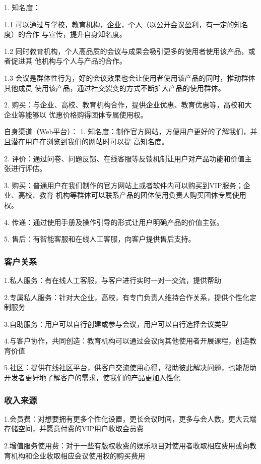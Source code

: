 \documentclass[a4paper,12pt]{article}
\begin{document}
    1. 知名度：

    1.1 可以通过与学校，教育机构，企业，个人（以公开会议盈利，有一定的知名度）的合作
    与宣传，提升自身知名度。

    1.2 同时教育机构，个人高品质的会议与成果会吸引更多的使用者使用该产品，或者促进其
    他机构与个人与产品的合作。

    1.3 会议是群体性行为，好的会议效果也会让使用者使用该产品的同时，推动群体其他成员
    使用该产品，通过社交裂变的方式不断扩大产品的使用群体。


    2. 购买：与企业、高校、教育机构合作，提供企业优惠、教育优惠等，高校和大企业等能够以
    优惠价格购得团体专属使用权。

    \noindent 自身渠道（Web平台）：
    1. 知名度：制作官方网站，方便用户更好的了解我们，并且潜在用户在浏览到我们的网站时可以提
    高知名度。

    2. 评价：通过问卷、问题反馈、在线客服等反馈机制让用户对产品功能和价值主张进行评估。

    3. 购买：普通用户在我们制作的官方网站上或者软件内可以购买到VIP服务；企业、高校、教育
    机构等群体可以联系产品的团体使用负责人购买团体专属使用权。

    4. 传递：通过使用手册及操作引导的形式让用户明确产品的价值主张。

    5. 售后：有智能客服和在线人工客服，向客户提供售后支持。
    \subsubsection{客户关系}
    1.私人服务：有在线人工客服，与客户进行实时一对一交流，提供帮助

    2.专属私人服务：针对大企业，高校，有专门负责人维持合作关系，提供个性化定制服务

    3.自助服务：用户可以自行创建或参与会议，用户可以自行选择会议类型

    4.与客户协作，共同创造：教育机构可以通过会议向其他使用者开展课程，创造教育价值

    5.社区：提供在线社区平台，供客户交流使用心得，帮助彼此解决问题，也能帮助开发者更好地了解客户的需求，使我们的产品更加人性化
    \subsubsection{收入来源}
    1.会员费：对想要拥有更多个性化设置，更长会议时间，更多与会人数，更大云端存储空间，并愿意付费的VIP用户收取会员费

    2.增值服务使用费：对于一些有版权收费的娱乐项目对使用者收取相应费用或向教育机构和企业收取相应会议使用权的购买费用
\end{document}
